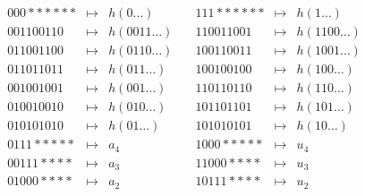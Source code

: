 \documentclass[a4paper]{article}
\newcommand{\any}{{*}}
\begin{document}
\[
 \begin{array}{rcl}
 000\any\any\any\any\any\any & \mapsto & h(0\dots) \\
 001100110 & \mapsto & h(0011\dots) \\
 011001100 & \mapsto & h(0110\dots) \\
 011011011 & \mapsto & h(011\dots) \\
 001001001 & \mapsto & h(001\dots) \\
 010010010 & \mapsto & h(010\dots) \\
 010101010 & \mapsto & h(01\dots) \\

 0111\any\any\any\any\any & \mapsto & a_4 \\
 00111\any\any\any\any & \mapsto & a_3 \\

 01000\any\any\any\any & \mapsto & a_2 \\
 \end{array} \quad
 \begin{array}{rcl}
 111\any\any\any\any\any\any & \mapsto & h(1\dots) \\
 110011001 & \mapsto & h(1100\dots) \\
 100110011 & \mapsto & h(1001\dots) \\
 100100100 & \mapsto & h(100\dots) \\
 110110110 & \mapsto & h(110\dots) \\
 101101101 & \mapsto & h(101\dots) \\
 101010101 & \mapsto & h(10\dots) \\

 1000\any\any\any\any\any & \mapsto & u_4 \\
 11000\any\any\any\any & \mapsto & u_3 \\

 10111\any\any\any\any & \mapsto & u_2 \\
 \end{array}
\]
\end{document}
